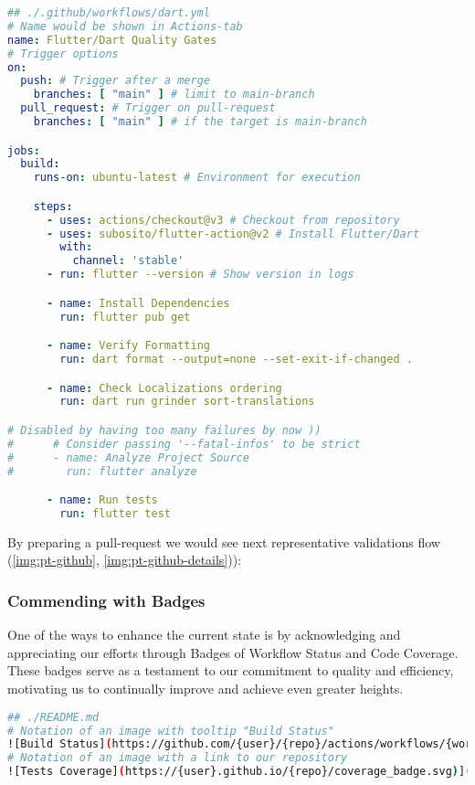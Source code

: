 \begin{lstlisting}[language=yaml]
## ./.github/workflows/dart.yml
# Name would be shown in Actions-tab
name: Flutter/Dart Quality Gates 
# Trigger options
on:
  push: # Trigger after a merge
    branches: [ "main" ] # limit to main-branch
  pull_request: # Trigger on pull-request
    branches: [ "main" ] # if the target is main-branch

jobs:
  build:
    runs-on: ubuntu-latest # Environment for execution

    steps:
      - uses: actions/checkout@v3 # Checkout from repository
      - uses: subosito/flutter-action@v2 # Install Flutter/Dart
        with:
          channel: 'stable'
      - run: flutter --version # Show version in logs

      - name: Install Dependencies
        run: flutter pub get

      - name: Verify Formatting
        run: dart format --output=none --set-exit-if-changed .

      - name: Check Localizations ordering
        run: dart run grinder sort-translations

# Disabled by having too many failures by now )) 
#      # Consider passing '--fatal-infos' to be strict
#      - name: Analyze Project Source
#        run: flutter analyze

      - name: Run tests
        run: flutter test
\end{lstlisting}

\noindent By preparing a pull-request we would see next representative validations flow 
(\cref{img:pt-github}, \cref{img:pt-github-details})):




\subsubsection{Commending with Badges} \label{a-badges}

One of the ways to enhance the current state is by acknowledging and appreciating our efforts through Badges of Workflow 
Status and Code Coverage. These badges serve as a testament to our commitment to quality and efficiency, motivating us 
to continually improve and achieve even greater heights.

\begin{lstlisting}[language=bash]
## ./README.md
# Notation of an image with tooltip "Build Status" 
![Build Status](https://github.com/{user}/{repo}/actions/workflows/{workflow-name}.yml/badge.svg?branch=main)
# Notation of an image with a link to our repository
![Tests Coverage](https://{user}.github.io/{repo}/coverage_badge.svg)](https://github.com/{user}/{repo})
\end{lstlisting}

